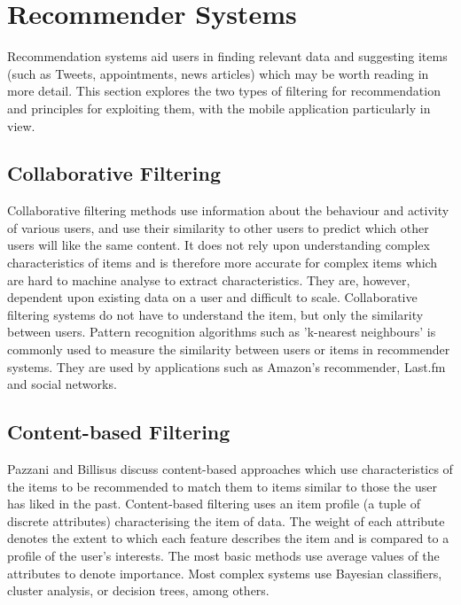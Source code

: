 \section{Recommender Systems}

Recommendation systems aid users in finding relevant data and suggesting items (such as Tweets, appointments, news articles) which may be worth reading in more detail. This section explores the two types of filtering for recommendation and principles for exploiting them, with the mobile application particularly in view.

\subsection{Collaborative Filtering}

Collaborative filtering methods \cite{CollaborativeRecommenderGoldberg} use information about the behaviour and activity of various users, and use their similarity to other users to predict which other users will like the same content. It does not rely upon understanding complex characteristics of items and is therefore more accurate for complex items which are hard to machine analyse to extract characteristics. They are, however, dependent upon existing data on a user and difficult to scale. 
Collaborative filtering systems do not have to understand the item, but only the similarity between users. Pattern recognition algorithms such as 'k-nearest neighbours' is commonly used to measure the similarity between users or items in recommender systems. They are used by applications such as Amazon's recommender, Last.fm and social networks. 

\subsection{Content-based Filtering}

Pazzani and Billisus discuss content-based approaches \cite{ContentRecommenderPazzani} which use characteristics of the items to be recommended to match them to items similar to those the user has liked in the past. Content-based filtering uses an item profile (a tuple of discrete attributes) characterising the item of data. The weight of each attribute denotes the extent to which each feature describes the item and is compared to a profile of the user's interests. The most basic methods use average values of the attributes to denote importance. Most complex systems use Bayesian classifiers, cluster analysis, or decision trees, among others.

